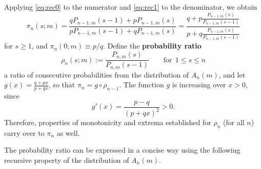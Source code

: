 \documentclass[11pt,draft]{article}
\begin{document}
Applying \eqref{eq:rec0} to the numerator and \eqref{eq:rec1} to the denominator,
we obtain
\[ \pi_n(s;m) =
\frac{qP_{n-1,m}(s-1) + pP_{n-1,m}(s)}{pP_{n-1,m}(s-1) + qP_{n-1,m}(s)} =
\frac{q + p \frac{P_{n-1,m}(s)}{P_{n-1,m}(s-1)}}
    {p + q \frac{P_{n-1,m}(s)}{P_{n-1,m}(s-1)}}
\]
for $s \geq 1$, and $\pi_n(0;m) \equiv p/q$.
Define the \textbf{probability ratio}
\[ \rho_n(s;m) := \frac{P_{n,m}(s)}{P_{n,m}(s-1)}
\qquad\text{for}\ \ 1 \leq s\leq n \]
a ratio of consecutive probabilities from the distribution of $A_n(m)$, and let
$g(x) = \frac{q + px}{p + qx}$, so that $\pi_n = g \circ \rho_{n-1}$.
The function $g$ is increasing over $x>0$, since
\[ g'(x) = \frac{p-q}{(p+qx)^2} > 0. \]
Therefore, properties of monotonicity and extrema established for $\rho_n$ (for
all $n$) carry over to $\pi_n$ as well.

The probability ratio can be expressed in a concise way using the following 
recursive property of the distribution of $A_n(m)$.
\end{document}
